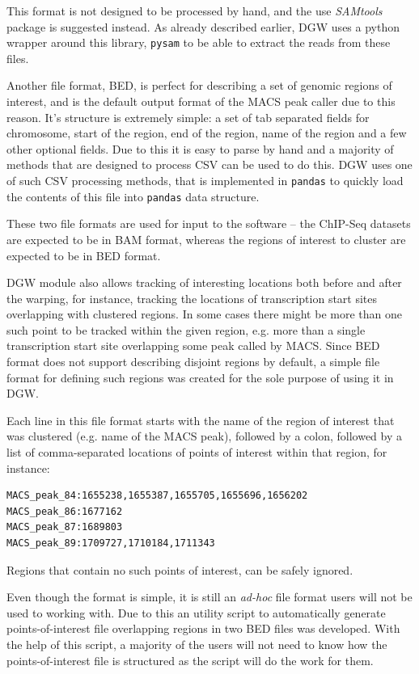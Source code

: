 \documentclass[parskip]{cs4rep}
\newcommand{\pythonpackage}[1]{{\tt #1}}
\begin{document}
This format is not designed to be processed by hand, and the use \emph{SAMtools} package is suggested instead. As already described earlier, DGW uses a python wrapper around this library, \pythonpackage{pysam} to be able to extract the reads from these files.

Another file format, BED, is perfect for describing a set of genomic regions of interest, and is the default output format of the MACS peak caller due to this reason. It's structure is extremely simple: a set of tab separated fields for chromosome, start of the region, end of the region, name of the region and a few other optional fields. Due to this it is easy to parse by hand and a majority of methods that are designed to process CSV can be used to do this. 
DGW uses one of such CSV processing methods, that is implemented in \pythonpackage{pandas} to quickly load the contents of this file into \pythonpackage{pandas} data structure.

These two file formats are used for input to the software -- the ChIP-Seq datasets are expected to be in BAM format, whereas the regions of interest to cluster are expected to be in BED format.

DGW module also allows tracking of interesting locations both before and after the warping, for instance, tracking the locations of transcription start sites overlapping with clustered regions. In some cases there might be more than one such point to be tracked within the given region, e.g. more than a single transcription start site overlapping some peak called by MACS. Since BED format does not support describing disjoint regions by default, a simple file format for defining such regions was created for the sole purpose of using it in DGW. 

Each line in this file format starts with the name of the region of interest that was clustered (e.g. name of the MACS peak), followed by a colon, followed by a list of comma-separated locations of points of interest within that region, for instance:

\begin{verbatim}
MACS_peak_84:1655238,1655387,1655705,1655696,1656202
MACS_peak_86:1677162
MACS_peak_87:1689803
MACS_peak_89:1709727,1710184,1711343
\end{verbatim}

Regions that contain no such points of interest, can be safely ignored.

Even though the format is simple, it is still an \emph{ad-hoc} file format users will not be used to working with. Due to this an utility script to automatically generate points-of-interest file overlapping regions in two BED files was developed. With the help of this script, a majority of the users will not need to know how the points-of-interest file is structured as the script will do the work for them.
\end{document}
